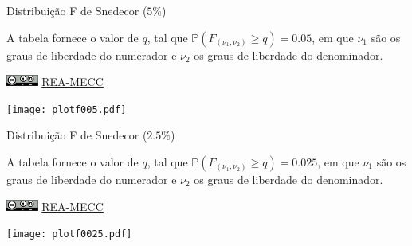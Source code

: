\documentclass[a4paper,12pt]{article}
\begin{document}
\newpage


\begin{landscape}

\begin{minipage}[l]{1\textwidth}
\begin{Huge}
Distribuição F de Snedecor ($5\%$)
\end{Huge}
\par
\vspace{2em}
A tabela fornece o valor de $q$, tal que $\mathbb{P}(F_{(\nu_1, \nu_2)} \geq q) = 0.05$, em que $\nu_1$ são os graus de liberdade do numerador e $\nu_2$ os graus de liberdade do denominador. 
\par\bigskip
\href{https://creativecommons.org/licenses/by-sa/4.0/deed.pt_BR}{\includegraphics[height=1em]{cc-by-sa.pdf}}
\href{https://rea-mecc.github.io}{REA-MECC}
\end{minipage}
\hfill
\begin{minipage}[c]{.35\textwidth}
\texttt{[image: plotf005.pdf]}
\end{minipage}



\end{landscape}


\newpage


\begin{landscape}

\begin{minipage}[l]{1\textwidth}
\begin{Huge}
Distribuição F de Snedecor ($2.5\%$)
\end{Huge}
\par
\vspace{2em}
A tabela fornece o valor de $q$, tal que $\mathbb{P}(F_{(\nu_1, \nu_2)} \geq q) = 0.025$, em que $\nu_1$ são os graus de liberdade do numerador e $\nu_2$ os graus de liberdade do denominador. 
\par\bigskip
\href{https://creativecommons.org/licenses/by-sa/4.0/deed.pt_BR}{\includegraphics[height=1em]{cc-by-sa.pdf}}
\href{https://rea-mecc.github.io}{REA-MECC}
\end{minipage}
\hfill
\begin{minipage}[c]{.35\textwidth}
\texttt{[image: plotf0025.pdf]}
\end{minipage}



\end{landscape}
\end{document}
